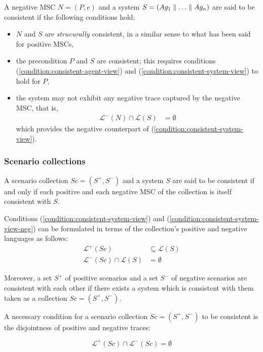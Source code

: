 A negative MSC $N = (P,e)$ and a system $S = (Ag_1 \parallel \ldots \parallel Ag_n)$ are said to be consistent if the following conditions hold:

\begin{itemize}
\item $N$ and $S$ are \emph{strucurally} consistent, in a similar sense to what has been said for positive MSCs,

\item the precondition $P$ and $S$ are consistent; this requires conditions (\ref{condition:consistent-agent-view}) and (\ref{condition:consistent-system-view}) to hold for $P$,

\item the system may not exhibit any negative trace captured by the negative MSC, that is,
\begin{align}\mathcal{L}^{-}(N) \cap \mathcal{L}(S) &= \emptyset\label{condition:consistent-system-view-neg}\end{align}
\noindent which provides the negative counterpart of (\ref{condition:consistent-system-view}).
\end{itemize}

\subsubsection*{Scenario collections}

A scenario collection $Sc = (S^+,S^-)$ and a system $S$ are said to be consistent if and only if each positive and each negative MSC of the collection is itself consistent with $S$. 

Conditions (\ref{condition:consistent-system-view}) and (\ref{condition:consistent-system-view-neg}) can be formulated in terms of the collection's positive and negative languages as follows:
\begin{align}
\mathcal{L}^+(Sc) & \subseteq \mathcal{L}(S) \\
\mathcal{L}^-(Sc) \cap \mathcal{L}(S) &= \emptyset
\end{align}

Moreover, a set $S^+$ of positive scenarios and a set $S^-$ of negative scenarios are consistent with each other if there exists a system which is consistent with them taken as a collection $Sc = (S^+,S^-)$. 

A necessary condition for a scenario collection $Sc = (S^+,S^-)$ to be consistent is the disjointness of positive and negative traces:

\begin{equation}
\mathcal{L}^+(Sc) \cap \mathcal{L}^-(Sc) = \emptyset
\end{equation}

